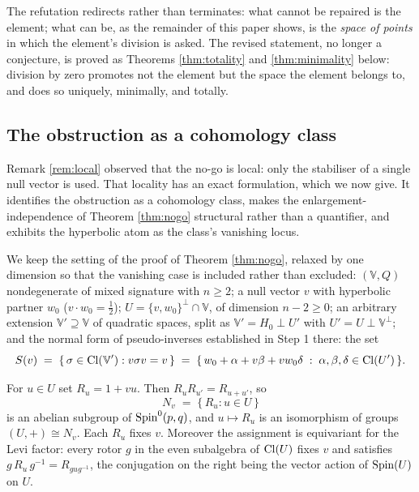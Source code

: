 The refutation redirects rather than terminates: what cannot be repaired is the element; what can be, as the remainder of this paper shows, is the \emph{space of points} in which the element's division is asked. The revised statement, no longer a conjecture, is proved as Theorems \ref{thm:totality} and \ref{thm:minimality} below: division by zero promotes not the element but the space the element belongs to, and does so uniquely, minimally, and totally.

\subsection{The obstruction as a cohomology class}\label{subsec:cohomology}

Remark \ref{rem:local} observed that the no-go is local: only the stabiliser of a single null vector is used. That locality has an exact formulation, which we now give. It identifies the obstruction as a cohomology class, makes the enlargement-independence of Theorem \ref{thm:nogo} structural rather than a quantifier, and exhibits the hyperbolic atom as the class's vanishing locus.

We keep the setting of the proof of Theorem \ref{thm:nogo}, relaxed by one dimension so that the vanishing case is included rather than excluded: $(\mathbb{V}, Q)$ nondegenerate of mixed signature with $n \geq 2$; a null vector $v$ with hyperbolic partner $w_0$ ($v \cdot w_0 = \tfrac12$); $U = \{v, w_0\}^\perp \cap \mathbb{V}$, of dimension $n - 2 \geq 0$; an arbitrary extension $\mathbb{V}' \supseteq \mathbb{V}$ of quadratic spaces, split as $\mathbb{V}' = H_0 \perp U'$ with $U' = U \perp \mathbb{V}^\perp$; and the normal form of pseudo-inverses established in Step 1 there: the set
\[
S(v) \;=\; \{\, \sigma \in \mathrm{Cl}(\mathbb{V}') : v\sigma v = v \,\}
\;=\; \{\, w_0 + \alpha + v\beta + vw_0\delta \;:\; \alpha, \beta, \delta \in \mathrm{Cl}(U') \,\}.
\]

\begin{lemma}\label{lem:Nv}
For $u \in U$ set $R_u = 1 + vu$. Then $R_u R_{u'} = R_{u + u'}$, so
\[
N_v \;=\; \{\, R_u : u \in U \,\}
\]
is an abelian subgroup of $\mathrm{Spin}^0(p,q)$, and $u \mapsto R_u$ is an isomorphism of groups $(U, +) \cong N_v$. Each $R_u$ fixes $v$. Moreover the assignment is equivariant for the Levi factor: every rotor $g$ in the even subalgebra of $\mathrm{Cl}(U)$ fixes $v$ and satisfies $g\, R_u\, g^{-1} = R_{g u g^{-1}}$, the conjugation on the right being the vector action of $\mathrm{Spin}(U)$ on $U$.
\end{lemma}

